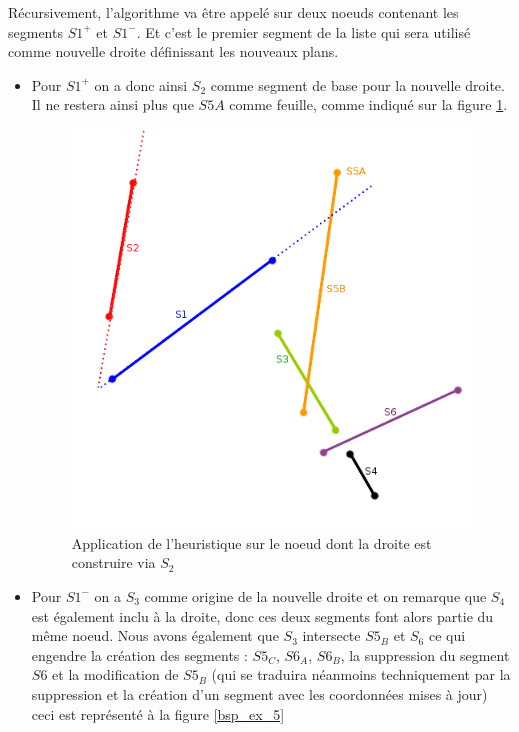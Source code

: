 \documentclass[11pt,a4paper]{article}
\theoremstyle{definition}
\theoremstyle{remark}
\begin{document}
Récursivement, l'algorithme va être appelé sur deux noeuds contenant les segments $S1^+$ et $S1^-$. Et c'est le premier segment de la liste qui sera utilisé comme nouvelle droite définissant les nouveaux plans. 
\begin{itemize}
\item Pour $S1^+$ on a donc ainsi $S_2$ comme segment de base pour la nouvelle droite. Il ne restera ainsi plus que $S5A$ comme feuille, comme indiqué sur la figure \ref{bsp_ex_4}.
\begin{figure}[H]
\centering
\includegraphics[scale=0.6]{bsp_ex_4.png}
\caption{Application de l'heuristique sur le noeud dont la droite est construire via $S_2$}
\label{bsp_ex_4}
\end{figure}

\item Pour $S1^-$ on a $S_3$ comme origine de la nouvelle droite et on remarque que $S_4$ est également inclu à la droite, donc ces deux segments font alors partie du même noeud. Nous avons également que $S_3$ intersecte $S5_B$ et $S_6$ ce qui engendre la création des segments : $S5_C$, $S6_A$, $S6_B$, la suppression du segment $S6$ et la modification de $S5_B$ (qui se traduira néanmoins techniquement par la suppression et la création d'un segment avec les coordonnées mises à jour) ceci est représenté à la figure \ref{bsp_ex_5}
\end{itemize}
\end{document}
